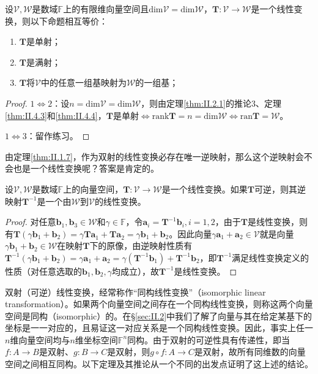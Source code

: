 \documentclass[main.tex]{subfiles}
\begin{document}
\begin{corollary}
设$\mathcal{V},\mathcal{W}$是数域$\mathbb{F}$上的有限维向量空间且$\mathrm{dim}\mathcal{V}=\mathrm{dim}\mathcal{W}$，$\mathbf{T}:\mathcal{V}\rightarrow\mathcal{W}$是一个线性变换，则以下命题相互等价：
\begin{enumerate}
    \item $\mathbf{T}$是单射；
    \item $\mathbf{T}$是满射；
    \item $\mathbf{T}$将$\mathcal{V}$中的任意一组基映射为$\mathcal{W}$的一组基；
\end{enumerate}
\end{corollary}
\begin{proof}
$1\Leftrightarrow 2$：设$n=\mathrm{dim}\mathcal{V}=\mathrm{dim}\mathcal{W}$，则由定理\ref{thm:II.2.1}的推论3、定理\ref{thm:II.4.3}和\ref{thm:II.4.4}，$\mathbf{T}$是单射$\Leftrightarrow\mathrm{rank}\mathbf{T}=n=\mathrm{dim}\mathcal{W}\Leftrightarrow\mathrm{ran}\mathbf{T}=\mathcal{W}$。

$1\Leftrightarrow 3$：留作练习。
\end{proof}

由定理\ref{thm:II.1.7}，作为双射的线性变换必存在唯一逆映射，那么这个逆映射会不会也是一个线性变换呢？答案是肯定的。

\begin{theorem}
设$\mathcal{V},\mathcal{W}$是数域$\mathbb{F}$上的向量空间，$\mathbf{T}:\mathcal{V}\rightarrow\mathcal{W}$是一个线性变换。如果$\mathbf{T}$可逆，则其逆映射$\mathbf{T}^{-1}$是一个由$\mathcal{W}$到$\mathcal{V}$的线性变换。
\end{theorem}
\begin{proof}
对任意$\mathbf{b}_1,\mathbf{b}_3\in\mathcal{W}$和$\gamma\in\mathbb{F}$，令$\mathbf{a}_i=\mathbf{T}^{-1}\mathbf{b}_i,i=1,2$，由于$\mathbf{T}$是线性变换，则有$\mathbf{T}\left(\gamma\mathbf{b}_1+\mathbf{b}_2\right)=\gamma\mathbf{Ta}_1+\mathbf{Ta}_2=\gamma\mathbf{b}_1+\mathbf{b}_2$。因此向量$\gamma\mathbf{a}_1+\mathbf{a}_2\in\mathcal{V}$就是向量$\gamma\mathbf{b}_1+\mathbf{b}_2\in\mathcal{W}$在映射$\mathbf{T}$下的原像，由逆映射性质有$\mathbf{T}^{-1}\left(\gamma\mathbf{b}_1+\mathbf{b}_2\right)=\gamma\mathbf{a}_1+\mathbf{a}_2=\gamma\left(\mathbf{T}^{-1}\mathbf{b}_1\right)+\mathbf{T}^{-1}\mathbf{b}_2$，即$\mathbf{T}^{-1}$满足线性变换定义的性质（对任意选取的$\mathbf{b}_1,\mathbf{b}_2,\gamma$均成立），故$\mathbf{T}^{-1}$是线性变换。
\end{proof}

双射（可逆）线性变换，经常称作“同构线性变换”（isomorphic linear transformation）。如果两个向量空间之间存在一个同构线性变换，则称这两个向量空间是同构（isomorphic）的。在\S\ref{sec:II.2}中我们了解了向量与其在给定某基下的坐标是一一对应的，且易证这一对应关系是一个同构线性变换。因此，事实上任一$n$维向量空间均与$n$维坐标空间$\mathbb{F}^n$同构。由于双射的可逆性具有传递性，即当$f:A\rightarrow B$是双射、$g:B\rightarrow C$是双射，则$g\circ f:A\rightarrow C$是双射，故所有同维数的向量空间之间相互同构。以下定理及其推论从一个不同的出发点证明了这上述的结论。
\end{document}
